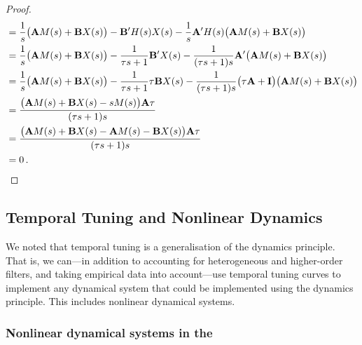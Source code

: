 \begin{proof}
\begin{align*}
	&= \frac{1}{s} \bigl( \mathbf{A} M(s) + \mathbf{B} X(s) \bigr)
	 - \mathbf{B}' H(s) X(s)
	 - \frac{1}{s} \mathbf{A}' H(s) \bigl(\mathbf{A} M(s) + \mathbf{B} X(s)\bigr) \\
	&= \frac{1}{s} \bigl( \mathbf{A} M(s) + \mathbf{B} X(s) \bigr)
	 - \frac{1}{\tau s + 1} \mathbf{B}' X(s)
	 - \frac{1}{(\tau s + 1) s} \mathbf{A}' \bigl( \mathbf{A} M(s) + \mathbf{B} X(s) \bigr) \\
	&= \frac{1}{s} \bigl( \mathbf{A} M(s) + \mathbf{B} X(s) \bigr)
	 - \frac{1}{\tau s + 1} \tau \mathbf{B} X(s)
	 - \frac{1}{(\tau s + 1) s} \bigl(\tau \mathbf{A} + \mathbf{I} \bigr) \bigl(\mathbf{A} M(s) + \mathbf{B} X(s)\bigr) \\
	&= \frac{\bigl(\mathbf{A} M(s) + \mathbf{B} X(s) - s M(s)\bigr) \mathbf{A} \tau}{(\tau s + 1) s} \\
	&= \frac{\bigl(\mathbf{A} M(s) + \mathbf{B} X(s) - \mathbf{A} M(s) - \mathbf{B} X(s)\bigr) \mathbf{A} \tau}{(\tau s + 1) s} \\
	&= 0 \,. \qedhere
\end{align*}
\end{proof}

\pagebreak

\subsection{Temporal Tuning and Nonlinear Dynamics}
\label{app:temporal_tuning_nonlinear}

We noted that temporal tuning is a generalisation of the \NEF dynamics principle.
That is, we can---in addition to accounting for heterogeneous and higher-order filters, and taking empirical data into account---use temporal tuning curves to implement any dynamical system that could be implemented using the dynamics principle.
This includes nonlinear dynamical systems.


\subsubsection{Nonlinear dynamical systems in the \NEF}

